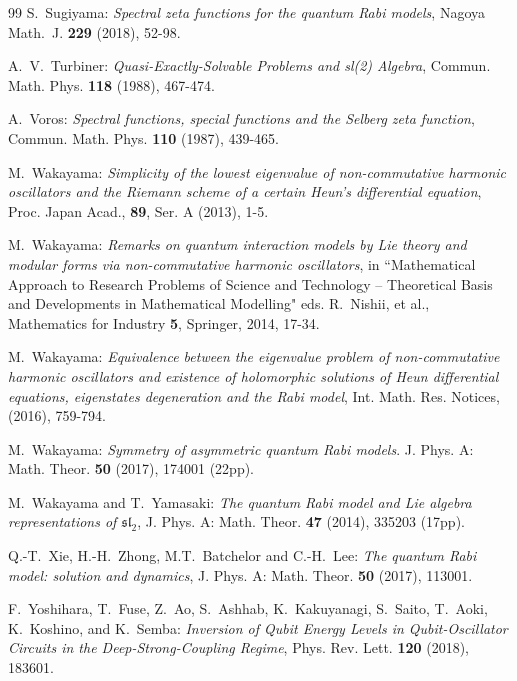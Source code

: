 \documentclass[11pt]{article}
\numberwithin{equation}{section}
\theoremstyle{plain}
\theoremstyle{definition}
\theoremstyle{remark}
\begin{document}
\begin{thebibliography}{99}
  S.~Sugiyama:
  \textit{Spectral zeta functions for the quantum Rabi models},
  Nagoya Math.~J. \textbf{229} (2018), 52-98.

  A.~V.~Turbiner:
  \textit{Quasi-Exactly-Solvable Problems and sl(2) Algebra}, Commun. Math. Phys. \textbf{118} (1988), 467-474.

A.~Voros:
\textit{Spectral functions, special functions and the Selberg zeta function}, Commun. Math. Phys. \textbf{110} (1987), 439-465.

  M.~Wakayama:
  \textit{Simplicity of the lowest eigenvalue of non-commutative harmonic oscillators and the Riemann scheme of a certain Heun's differential equation}, Proc. Japan Acad., \textbf{89}, Ser. A (2013), 1-5.

  M.~Wakayama:
  \textit{Remarks on quantum interaction models by Lie theory and modular forms via non-commutative harmonic oscillators}, in ``Mathematical Approach to Research Problems of Science  and Technology -- Theoretical Basis and Developments in Mathematical Modelling" eds. R.~Nishii, et al.,  Mathematics for Industry \textbf{5}, Springer, 2014, 17-34.

  M.~Wakayama:
  \textit{Equivalence between the eigenvalue problem of non-commutative harmonic oscillators and existence of holomorphic solutions of Heun differential equations,  eigenstates degeneration and the Rabi model}, Int. Math. Res. Notices, (2016), 759-794.

  M.~Wakayama:
  \textit{Symmetry of asymmetric quantum Rabi models}. J. Phys. A: Math. Theor.
  \textbf{50} (2017), 174001 (22pp).

  M.~Wakayama and T.~Yamasaki:
  \textit{The quantum Rabi model and Lie algebra representations of $\mathfrak{s}{{\mathfrak{l}}_{2}}$},
  J. Phys. A: Math. Theor. \textbf{47} (2014), 335203 (17pp).

  Q.-T.~Xie, H.-H.~Zhong, M.T.~Batchelor and C.-H.~Lee:
  \textit{The quantum Rabi model: solution and dynamics},
  J. Phys. A: Math. Theor. %
  \textbf{50} (2017), 113001.

F.~Yoshihara, T.~Fuse, Z.~Ao, S.~Ashhab, K.~Kakuyanagi, S.~Saito, T.~Aoki, K.~Koshino, and K.~Semba:  
\textit{Inversion of Qubit Energy Levels in Qubit-Oscillator Circuits in the Deep-Strong-Coupling Regime}, 
Phys. Rev. Lett. \textbf{120} (2018), 183601. 
  

\end{thebibliography}
\end{document}
